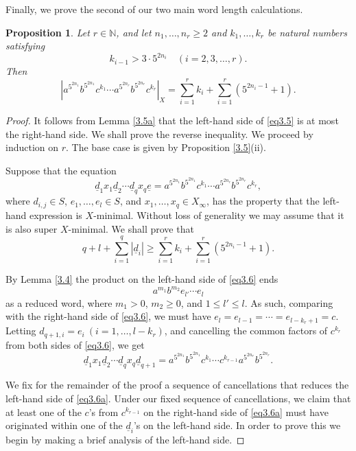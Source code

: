 \documentclass[twoside,11pt]{amsart}
\numberwithin{equation}{section}
\newtheorem{proposition}[theorem]{Proposition}
\theoremstyle{definition}
\newcommand {\N}{\mathbb N}
\newcommand{\1}{\mathbbm{1}}
\newcommand{\pdt}{\underline}
\begin{document}
	Finally, we prove the second of our two main word length calculations. 
	
	\begin{proposition}		\label{3.8}
		Let $r \in \N$, and let $n_1, \ldots, n_r \geq 2$ and $k_1, \ldots, k_r$ be natural numbers satisfying 
		$$k_{i-1} > 3\cdot 5^{2n_i} \quad (i = 2,3, \ldots, r).$$
		Then
		\begin{equation}	\label{eq3.5}
			\left|a^{5^{2n_1}} b^{5^{2n_1}} c^{k_1} \cdots a^{5^{2n_r}}b^{5^{2n_r}} c^{k_r} \right|_X = \sum _{i = 1}^r k_i + \sum_{i=1}^r (5^{2n_i-1} +1).
		\end{equation}
	\end{proposition}
	
	\begin{proof}		
		It follows from Lemma \ref{3.5a} that the left-hand side of \eqref{eq3.5} is at most the right-hand side. We shall prove the reverse inequality.		
		We proceed by induction on $r$. The base case is given by Proposition \ref{3.5}(ii).
		
		Suppose that the equation
		\begin{equation} 	\label{eq3.6}
			\pdt{d}_1 x_1 \pdt{d}_2 \cdots \pdt{d}_q x_q \pdt{e} = a^{5^{2n_1}} b^{5^{2n_1}} c^{k_1} \cdots a^{5^{2n_r}}b^{5^{2n_r}} c^{k_r},
		\end{equation}
		where $d_{i,j} \in S$, $e_1, \ldots , e_l \in S$, and $x_1, \ldots, x_q \in X_\infty$, has the property that the left-hand expression is $X$-minimal. Without loss of generality we may assume that it is also super $X$-minimal. We shall prove that 
		$$q+l + \sum_{i=1}^q |\pdt{d}_i| \geq \sum _{i = 1}^r k_i + \sum_{i=1}^r (5^{2n_i-1} +1).$$
		
		By Lemma \ref{3.4} the product on the left-hand side of \eqref{eq3.6} ends 
		$$a^{m_1}b^{m_2} e_{l'} \cdots e_l$$
		as a reduced word, where 
		$m_1>0$, $m_2 \geq 0$, and $1 \leq l' \leq l$. 
		As such, comparing with the right-hand side of \eqref{eq3.6}, we must have $e_l = e_{l-1} = \cdots = e_{l-k_r+1} = c$. Letting $d_{q+1, i} = e_i \ (i =1 , \ldots, l-k_r)$, and cancelling the common factors of $c^{k_r}$ from both sides of \eqref{eq3.6}, we get
		\begin{equation}		\label{eq3.6a}
			\pdt{d}_1 x_1 \pdt{d}_2 \cdots \pdt{d}_q x_q \pdt{d}_{q+1} = a^{5^{2n_1}} b^{5^{2n_1}} c^{k_1} \cdots c^{k_{r-1}}a^{5^{2n_r}}b^{5^{2n_r}}.
		\end{equation}
		
		We fix for the remainder of the proof a sequence of cancellations that reduces the left-hand side of \eqref{eq3.6a}.  Under our fixed sequence of cancellations, we claim that at least one of the $c$'s from $c^{k_{r-1}}$ on the right-hand side of \eqref{eq3.6a} must have originated within one of the $\pdt{d}_i$'s on the left-hand side. In order to prove this we begin by making a brief analysis of the left-hand side.
		

\end{proof}
\end{document}
